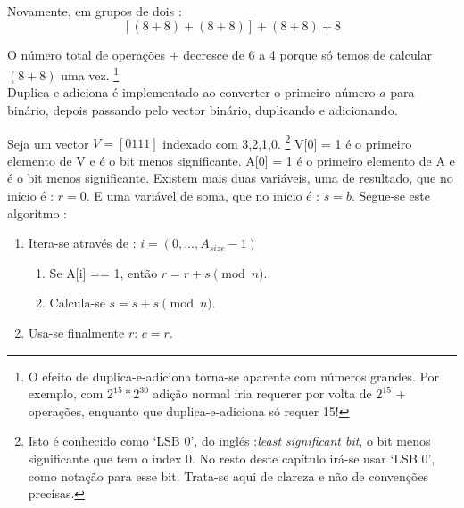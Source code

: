 Novamente, em grupos de dois : 
\[[(8+8) + (8+8)] + (8+8) + 8\]

O número total de operações $+$ decresce de 6 a 4 porque só temos de calcular $(8+8)$ uma vez.
\footnote{O efeito de duplica-e-adiciona torna-se aparente com números grandes. Por exemplo, com $2^{15} * 2^{30}$ adição normal iria requerer por volta de $2^{15}$ $+$ operações, enquanto que duplica-e-adiciona só requer 15!}\\ 

Duplica-e-adiciona é implementado ao converter o primeiro número $a$ para binário, depois passando pelo vector binário, duplicando e adicionando.


Seja um vector $V = [0111]$ indexado com 3,2,1,0. 
\footnote{Isto é conhecido como `LSB 0', do inglés :{\em least significant bit}, o bit menos significante que tem o index 0. No resto deste capítulo irá-se usar `LSB 0', como notação para esse bit. Trata-se aqui de clareza e não de convenções precisas.} 
V[0] = 1 é o primeiro elemento de V e é o bit menos significante. A[0] = 1 é o primeiro elemento de A e é o bit menos significante. Existem mais duas variáveis, uma de resultado, que no início é : $r = 0$. E uma variável de soma, que no início é : $s = b$. Segue-se este algoritmo :   
\begin{enumerate}
	\item Itera-se através de : $i = (0,...,A_{size} - 1)$
	\begin{enumerate}
		\item Se A[i] == 1, então $r = r + s \pmod n$.
		\item Calcula-se $s = s + s \pmod n$.
	\end{enumerate}
	\item Usa-se finalmente $r$: $c = r$.
\end{enumerate}

